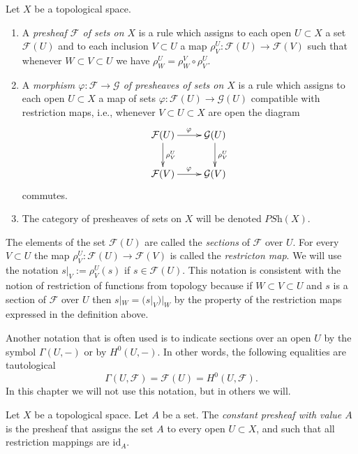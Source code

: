 \begin{definition}
\label{definition-presheaf}
Let $X$ be a topological space.
\begin{enumerate}
\item A {\it presheaf $\mathcal{F}$ of sets on $X$} is a rule which
assigns to each open $U \subset X$ a set $\mathcal{F}(U)$ and
to each inclusion $V \subset U$ a map
$\rho^U_V : \mathcal{F}(U) \to \mathcal{F}(V)$ such that
whenever $W \subset V \subset U$ we have 
$\rho^U_W = \rho^V_W \circ \rho ^U_V$.
\item A {\it morphism $\varphi : \mathcal{F} \to \mathcal{G}$ 
of presheaves of sets on $X$} is a rule which assigns to each
open $U \subset X$ a map of sets $\varphi : \mathcal{F}(U)
\to \mathcal{G}(U)$ compatible with restriction maps,
i.e., whenever $V \subset U \subset X$ are open the
diagram
$$
\xymatrix{
\mathcal{F}(U) \ar[r]^\varphi \ar[d]^{\rho^U_V} &
\mathcal{G}(U) \ar[d]^{\rho^U_V} \cr
\mathcal{F}(V) \ar[r]^\varphi & \mathcal{G}(V)
}
$$
commutes.
\item The category of presheaves of sets on $X$ will be denoted
$\textit{PSh}(X)$.
\end{enumerate}
\end{definition}

\noindent
The elements of the set $\mathcal{F}(U)$ are called
the {\it sections} of $\mathcal{F}$ over $U$.
For every $V \subset U$ the map
$\rho^U_V : \mathcal{F}(U) \to \mathcal{F}(V)$
is called the {\it restricton map}. We will use the
notation $s|_V := \rho^U_V(s)$ if $s\in \mathcal{F}(U)$.
This notation is consistent with the notion of restriction
of functions from topology because if $W \subset V \subset U$
and $s$ is a section of $\mathcal{F}$ over $U$ then
$s|_W = (s|_V)|_W$ by the property of the restriction maps
expressed in the definition above.

\medskip\noindent
Another notation that is often used is to indicate sections
over an open $U$ by the symbol $\Gamma(U, -)$ or by
$H^0(U, -)$. In other words, the following equalities
are tautological
$$
\Gamma(U, \mathcal{F}) = \mathcal{F}(U) = H^0(U, \mathcal{F}).
$$
In this chapter we will not use this notation, but in others
we will.

\begin{definition}
\label{definition-constant-presheaf}
Let $X$ be a topological space. Let $A$ be a set.
The {\it constant presheaf with value $A$} is the
presheaf that assigns the set $A$ to every open
$U \subset X$, and such that all restriction mappings
are $\text{id}_A$.
\end{definition}

